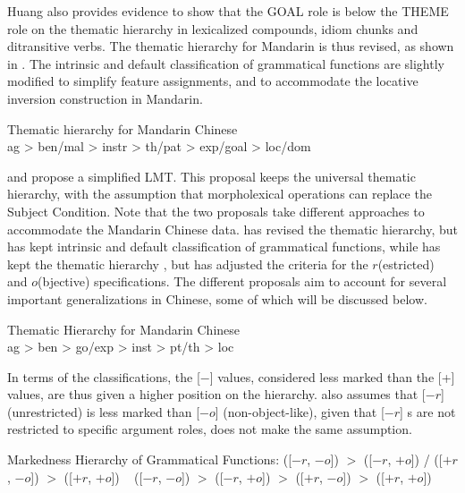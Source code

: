 \documentclass[output=paper,chinesefont,hidelinks]{langscibook}
\begin{document}
    Huang also provides evidence to show that the GOAL role is below the THEME role on the thematic hierarchy in lexicalized compounds, idiom chunks and ditransitive verbs. The thematic hierarchy for Mandarin is thus revised, as shown in . The intrinsic and default classification of grammatical functions  are slightly modified to simplify feature assignments, and to accommodate the locative inversion construction in Mandarin.

\ea%
    \label{ex:Sinitic:55} Thematic hierarchy for Mandarin Chinese \citep{Huang1993a}\\
    ag > ben/mal > instr > th/pat > exp/goal > loc/dom
    \z

\citet{HuangHer1998} and \citet{Her2010} propose a simplified LMT. This proposal keeps the universal thematic hierarchy, with the assumption that morpholexical operations can replace the Subject Condition. Note that the two proposals take different approaches to accommodate the Mandarin Chinese data. \citet{Huang1993a} has revised the thematic hierarchy, but has kept intrinsic and default classification of grammatical functions, while \citet{Her2010} has kept the thematic hierarchy , but has adjusted the criteria for the {\pm}$r$(estricted) and {\pm}$o$(bjective) specifications. The different proposals aim to account for several important generalizations in Chinese, some of which will be discussed below.

\ea%
    \label{ex:Sinitic:56} Thematic Hierarchy for Mandarin Chinese \citep{Her2010}\\
    {ag} > {ben} > {go}/{exp} > {inst} > {pt}/{th} > {loc}
    \z

  In terms of the classifications, the [$-$] values, considered less marked than the [+] values, are thus given a higher position on the hierarchy. \citet{Her2010} also assumes that [$-r$] (unrestricted) is less marked than [$-o$] (non-object-like), given that [$-r$] {\GF}s are not restricted to specific argument roles, \citet{Huang1993a} does not make the same assumption.

\ea%
    \label{ex:Sinitic:57} Markedness Hierarchy of Grammatical Functions:
    \ea\label{ex:Sinitic:57a}
    \SUBJ([$-r$, $-o$]) $>$ \OBJ([$-r$, $+o$]) / \OBLTHETA([$+r$, $-o$]) $>$ \OBJTHETA([$+r$, $+o$]) ~ \citep{Huang1993b}
    \ex\label{ex:Sinitic:57b}
    \SUBJ([$-r$, $-o$]) $>$ \OBJ([$-r$, $+o$]) $>$ \OBLTHETA([$+r$, $-o$]) $>$ \OBJTHETA([$+r$, $+o$]) ~ \citep{Her2010}
    \z\z
\end{document}
